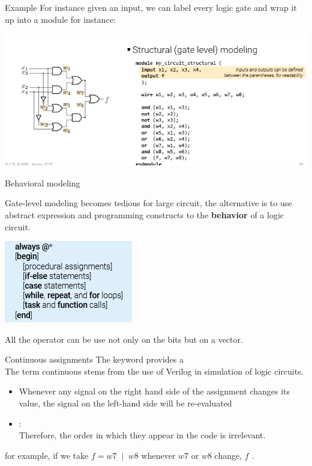 \begin{parag}{Example}
For instance given an input, we can label every logic gate and wrap it up into a module for instance:
\begin{center}
    \includegraphics[scale=0.6]{12025-03-26.png}
\end{center}

\end{parag}
\begin{parag}{Behavioral modeling}

    Gate-level modeling becomes tedious for large circuit, the alternative is to use abstract expression and programming constructs to  the \textbf{behavior} of a logic circuit.
    \begin{center}
        \includegraphics[scale=0.5]{22025-03-26.png}
    \end{center}
    All the operator can be use not only on the bits but on a vector.
    \begin{subparag}{Continuous assignments}
        The  keyword provides a \\
        The term continuous stems from the use of Verilog in simulation of logic circuits.
        \begin{itemize}
            \item Whenever any signal on the right hand side of the assignment changes its value, the signal on the left-hand side will be re-evaluated
            \item {}:\\
                Therefore, the order in which they appear in the code is irrelevant.
        \end{itemize}
        \begin{framedremark}
            for example, if we take $f = w7\; \mid\; w8$ whenever $w7$ or $w8$ change, $f$ .
        \end{framedremark}
    \end{subparag}
    
\end{parag}


